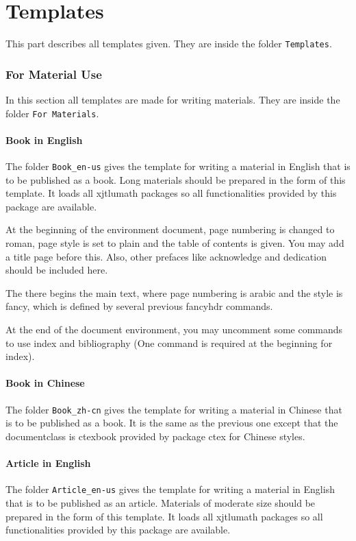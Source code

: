 \part{Templates}
This part describes all templates given. They are inside the folder \verb|Templates|.
\section{For Material Use}
In this section all templates are made for writing materials. They are inside the folder \verb|For Materials|.
\subsection{Book in English}
The folder \verb=Book_en-us= gives the template for writing a material in English that is to be published as a book. Long materials should be prepared in the form of this template. It loads all xjtlumath packages so all functionalities provided by this package are available.

At the beginning of the environment document, page numbering is changed to roman, page style is set to plain and the table of contents is given. You may add a title page before this. Also, other prefaces like acknowledge and dedication should be included here.

The there begins the main text, where page numbering is arabic and the style is fancy, which is defined by several previous fancyhdr commands.

At the end of the document environment, you may uncomment some commands to use index and bibliography (One command is required at the beginning for index).

\subsection{Book in Chinese}
The folder \verb=Book_zh-cn= gives the template for writing a material in Chinese that is to be published as a book. It is the same as the previous one except that the documentclass is ctexbook provided by package ctex for Chinese styles.

\subsection{Article in English}
The folder \verb=Article_en-us= gives the template for writing a material in English that is to be published as an article. Materials of moderate size should be prepared in the form of this template. It loads all xjtlumath packages so all functionalities provided by this package are available.

